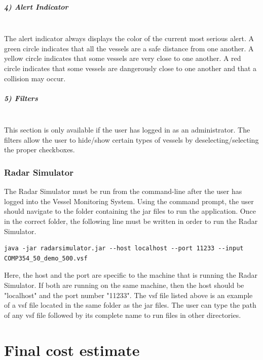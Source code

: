 \documentclass{article}
\begin{document}
\pagebreak
\subparagraph{4) Alert Indicator \\ \\}
The alert indicator always displays the color of the current most serious alert. A green circle indicates that all the vessels are a safe distance from one another. A yellow circle indicates that some vessels are very close to one another. A red circle indicates that some vessels are dangerously close to one another and that a collision may occur.\\

\subparagraph{5) Filters \\ \\}
This section is only available if the user has logged in as an administrator. The filters allow the user to hide/show certain types of vessels by deselecting/selecting the proper checkboxes.\\

\subsubsection{Radar Simulator}
The Radar Simulator must be run from the command-line after the user has logged into the Vessel Monitoring System. Using the command prompt, the user should navigate to the folder containing the jar files to run the application. Once in the correct folder, the following line must be written in order to run the Radar Simulator.

\begin{verbatim}
java -jar radarsimulator.jar --host localhost --port 11233 --input COMP354_50_demo_500.vsf
\end{verbatim}

Here, the host and the port are specific to the machine that is running the Radar Simulator. If both are running on the same machine, then the host should be "localhost" and the port number "11233". The vsf file listed above is an example of a vsf file located in the same folder as the jar files. The user can type the path of any vsf file followed by its complete name to run files in other directories.

\break

\section{Final cost estimate} %

\end{document}
